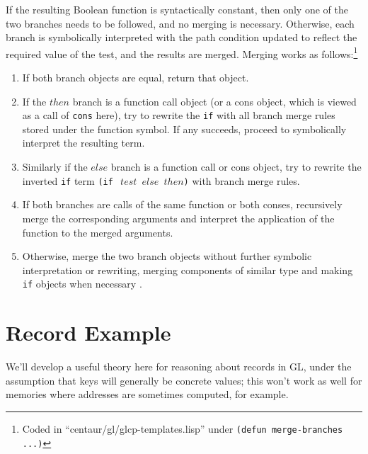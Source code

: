 \documentclass[submission,copyright,creativecommons]{eptcs}
\newcommand*{\var}[1]{\mathit{#1}}
\begin{document}
If the resulting Boolean function is syntactically constant, then only
one of the two branches needs to be followed, and no merging is
necessary.  Otherwise, each branch is symbolically interpreted with
the path condition updated to reflect the required value of the test,
and the results are merged.  Merging works as follows:\footnote{Coded
  in ``centaur/gl/glcp-templates.lisp'' under \texttt{(defun
    merge-branches ...)}}
\begin{enumerate}
\item If both branch objects are equal, return that object.
\item If the $\var{then}$ branch is a function call object (or a
  cons object, which is viewed as a call of \texttt{cons} here), try
  to rewrite the \texttt{if} with all branch merge rules stored
  under the function symbol.  If any succeeds, proceed to
  symbolically interpret the resulting term.
\item Similarly if the $\var{else}$ branch is a function call or
  cons object, try to rewrite the inverted \texttt{if} term
  \texttt{(if $~\var{test}$ $\var{else}$ $\var{then}$)} with branch
  merge rules.
\item If both branches are calls of the same function or both
  conses, recursively merge the corresponding arguments and
  interpret the application of the function to the merged arguments.
\item Otherwise, merge the two branch objects without further symbolic
  interpretation or rewriting, merging components of similar type and
  making \texttt{if} objects when necessary \cite{gl-diss}.
\end{enumerate}
  
\section{Record Example}
\label{sec:example}

We'll develop a useful theory here for reasoning about records in GL,
under the assumption that keys will generally be concrete values; this
won't work as well for memories where addresses are sometimes
computed, for example.
\end{document}
